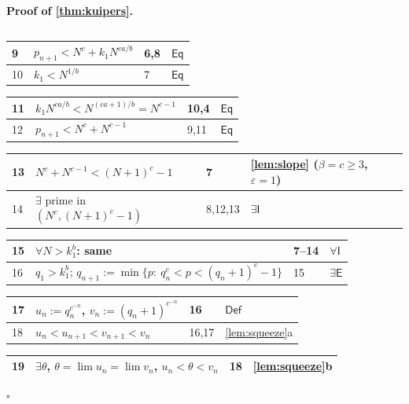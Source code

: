 \documentclass[11pt,reqno]{amsart}
\theoremstyle{blueplain}
\renewcommand{\qedsymbol}{\textcolor{proofqed}{\ensuremath{\square}}}
\renewenvironment{proof}[1][Proof]{\par\noindent\textbf{\textcolor{proofhead}{#1.}}\par\nobreak}{\par\nobreak\hfill\qedsymbol}
\numberwithin{equation}{section}
\begin{document}
\begin{proof}[\textbf{Proof of \cref{thm:kuipers}}]
{\begin{tabular}{|m{0.7cm}|m{12cm}|m{1.4cm}|m{2.5cm}|}
		\end{tabular}%
		\noindent \newline
		\noindent
		\begin{tabular}{|m{0.7cm}|m{12cm}|m{1.4cm}|m{2.5cm}|}
			\hline
			9 & $p_{n+1}<N^{c}+k_1 N^{ca/b}$ & 6,8 & $\mathsf{Eq}$ \\ \hline
					10 & $k_1<N^{1/b}$ & 7 & $\mathsf{Eq}$ \\
	\end{tabular}%
\noindent \newline
\noindent
\begin{tabular}{|m{0.7cm}|m{12cm}|m{1.4cm}|m{2.5cm}|}
\hline
11 & $k_1 N^{ca/b}<N^{(ca+1)/b}=N^{c-1}$ & 10,4 & $\mathsf{Eq}$ \\ \hline
12 & $p_{n+1}<N^{c}+N^{c-1}$ & 9,11 & $\mathsf{Eq}$ \\
\end{tabular}%
\noindent \newline
\noindent
\begin{tabular}{|m{0.7cm}|m{12cm}|m{1.4cm}|m{2.5cm}|}
\hline
13 & $N^{c}+N^{c-1}<(N+1)^{c}-1$ & 7 & \cref{lem:slope} ($\beta=c\ge 3$, $\varepsilon=1$) \\ \hline
14 & $\exists$ prime in $(N^{c},(N+1)^{c}-1)$ & 8,12,13 & $\exists\mathsf{I}$ \\
\end{tabular}%
\noindent \newline
\noindent
\begin{tabular}{|m{0.7cm}|m{12cm}|m{1.4cm}|m{2.5cm}|}
\hline
15 & $\forall N>k_1^{b}$: same & 7--14 & $\forall\mathsf{I}$ \\ \hline
16 & $q_1>k_1^{b}$; $q_{n+1}:=\min\{p:\ q_n^{c}<p<(q_n+1)^{c}-1\}$ & 15 & $\exists\mathsf{E}$ \\
\end{tabular}%
\noindent \newline
\noindent
\begin{tabular}{|m{0.7cm}|m{12cm}|m{1.4cm}|m{2.5cm}|}
\hline
17 & $u_n:=q_n^{c^{-n}}$, $v_n:=(q_n+1)^{c^{-n}}$ & 16 & $\mathsf{Def}$ \\ \hline
18 & $u_n<u_{n+1}<v_{n+1}<v_n$ & 16,17 & \cref{lem:squeeze}a \\
\end{tabular}%
\noindent \newline
\noindent
\begin{tabular}{|m{0.7cm}|m{12cm}|m{1.4cm}|m{2.5cm}|}
\hline
19 & $\exists\theta$, $\theta=\lim u_n=\lim v_n$, $u_n<\theta<v_n$ & 18 & \cref{lem:squeeze}b \\ \hline

\end{tabular}}
\end{proof}
\end{document}

